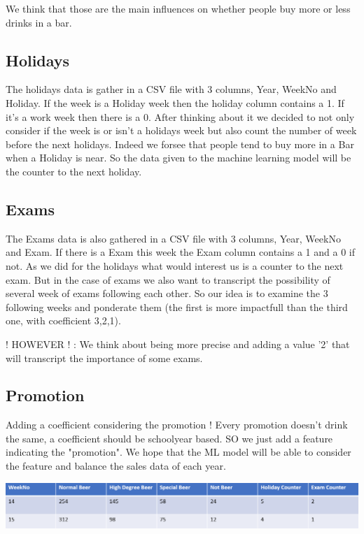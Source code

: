 \documentclass{report}
\begin{document}
We think that those are the main influences on whether people buy more or less drinks in a bar.

\subsection{Holidays}

The holidays data is gather in a CSV file with 3 columns, Year, WeekNo and Holiday. If the week is a Holiday week then the holiday column contains a 1. If it's a work week then there is a 0. After thinking about it we decided to not only consider if the week is or isn't a holidays week but also count the number of week before the next holidays. Indeed we forsee that people tend to buy more in a Bar when a Holiday is near.
So the data given to the machine learning model will be the counter to the next holiday.

\subsection{Exams}

The Exams data is also gathered in a CSV file with 3 columns, Year, WeekNo and Exam. If there is a Exam this week the Exam column contains a 1 and a 0 if not. As we did for the holidays what would interest us is a counter to the next exam. But in the case of exams we also want to transcript the possibility of several week of exams following each other. So our idea is to examine the 3 following weeks and ponderate them (the first is more impactfull than the third one, with coefficient 3,2,1). 


! HOWEVER ! : We think about being more precise and adding a value '2' that will transcript the importance of some exams.

\subsection{Promotion}


Adding a coefficient considering the promotion ! Every promotion doesn't drink the same, a coefficient should be schoolyear based. SO we just add a feature indicating the "promotion". We hope that the ML model will be able to consider the feature and balance the sales data of each year.


\includegraphics[scale=0.7]{DataModel}
\end{document}
